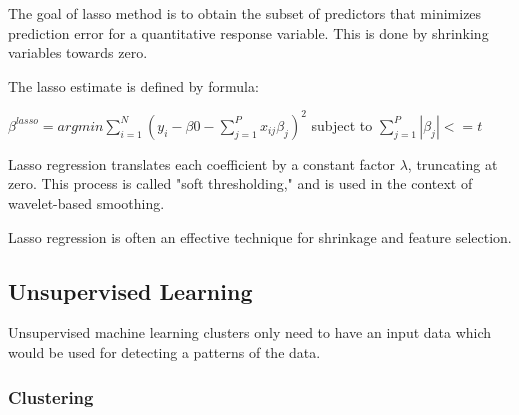 \begin{enumerate}
    The goal of lasso method is to obtain the subset of predictors that minimizes prediction error for a quantitative response variable. This is done by shrinking variables towards zero.
    
    The lasso estimate is defined by formula:
    
    $\beta^{\mathit{lasso}} = argmin \sum_{i=1}^N(y_{i} - \beta{0} - \sum_{j=1}^P x_{ij}\beta_{j})^2$ subject to $\sum_{j=1}^P |\beta_{j}| <= t$ 
    
    Lasso regression translates each coefficient by a constant factor $\lambda$, truncating at zero. This process is called "soft thresholding," and is used in the context of wavelet-based smoothing.
    
    Lasso regression is often an effective technique for shrinkage and feature selection.
    
\end{enumerate}


\subsection{Unsupervised Learning}

Unsupervised machine learning clusters only need to have an input data which would be used for detecting a patterns of the data.  

\subsubsection{Clustering}

